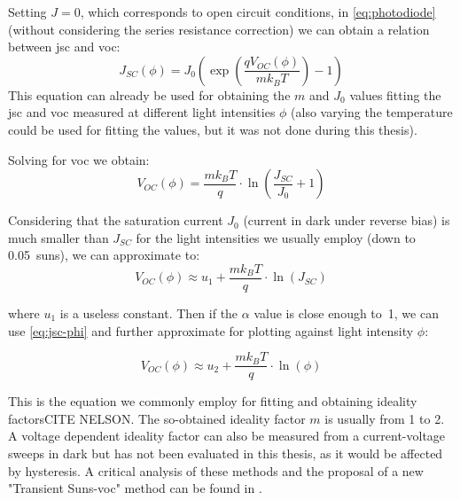 		Setting $J=0$, which corresponds to open circuit conditions, in \cref{eq:photodiode} (without considering the series resistance correction) we can obtain a relation between \gls{jsc} and \gls{voc}:
		$$J_{SC}(\phi) = J_0\left(\exp\left(\frac{qV_{OC}(\phi)}{mk_BT}\right)-1\right)$$
		This equation can already be used for obtaining the $m$ and $J_0$ values fitting the \gls{jsc} and \gls{voc} measured at different light intensities $\phi$ (also varying the temperature could be used for fitting the values, but it was not done during this thesis).

		Solving for \gls{voc} we obtain:
		$$V_{OC}(\phi) = \frac{mk_BT}{q}\cdot\ln\left(\frac{J_{SC}}{J_0} + 1\right)$$

		Considering that the saturation current $J_0$ (current in dark under reverse bias) is much smaller than $J_{SC}$ for the light intensities we usually employ (down to \SI{0.05}{suns}), we can approximate to:
		$$V_{OC}(\phi) \approx u_1 + \frac{mk_BT}{q}\cdot\ln(J_{SC})$$

		where $u_1$ is a useless constant. Then if the $\alpha$ value is close enough to~1, we can use \cref{eq:jsc-phi} and further approximate for plotting against light intensity $\phi$:

		$$V_{OC}(\phi) \approx u_2 + \frac{mk_BT}{q}\cdot\ln(\phi)$$

		This is the equation we commonly employ for fitting and obtaining ideality factorsCITE NELSON. %
		The so-obtained ideality factor $m$ is usually from 1 to 2. A voltage dependent ideality factor can also be measured from a current-voltage sweeps in dark but has not been evaluated in this thesis, as it would be affected by hysteresis. A critical analysis of these methods and the proposal of a new "Transient Suns-\gls{voc}" method can be found in . %

